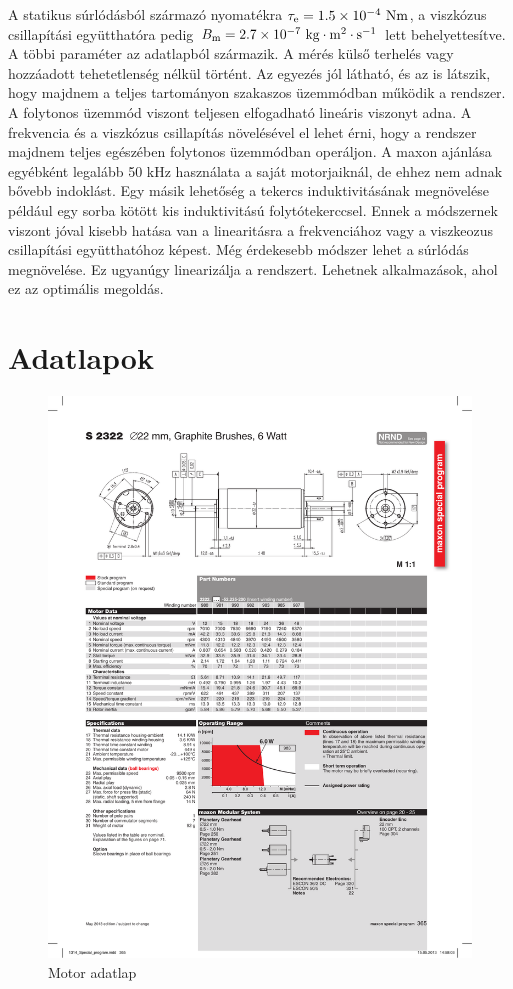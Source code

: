 A statikus súrlódásból származó nyomatékra \(\tau_{\mathrm{e}} = 1.5 \times 10^{-4}~\mathrm{Nm}\), a viszkózus csillapítási együtthatóra pedig 
\(B_{\mathrm{m}} = 2.7 \times 10^{-7}~\mathrm{kg \cdot m^2 \cdot s^{-1}}\) lett behelyettesítve. A többi paraméter az adatlapból származik. 
A mérés külső terhelés vagy hozzáadott tehetetlenség nélkül történt. Az egyezés jól látható, és az is látszik, hogy majdnem a 
teljes tartományon szakaszos üzemmódban működik a rendszer. A folytonos üzemmód viszont teljesen elfogadható 
lineáris viszonyt adna. A frekvencia és a viszkózus csillapítás növelésével el lehet érni, hogy a rendszer majdnem teljes 
egészében folytonos üzemmódban operáljon. A maxon ajánlása egyébként legalább 50 kHz használata a saját motorjaiknál, 
de ehhez nem adnak bővebb indoklást. Egy másik lehetőség a tekercs induktivitásának megnövelése például egy sorba kötött kis 
induktivitású folytótekerccsel. Ennek a módszernek viszont jóval kisebb hatása van a linearitásra a frekvenciához vagy a 
viszkeozus csillapítási együtthatóhoz képest. Még érdekesebb módszer lehet a súrlódás megnövelése. Ez ugyanúgy linearizálja a rendszert. 
Lehetnek alkalmazások, ahol ez az optimális megoldás. 

\chapter{Adatlapok}
\begin{figure}[H]
    \begin{center}
    \includegraphics[width=\textwidth]{images/motor.pdf}
    \caption{Motor adatlap}\label{fig:motor_datasheet}
    \end{center}
\end{figure}

